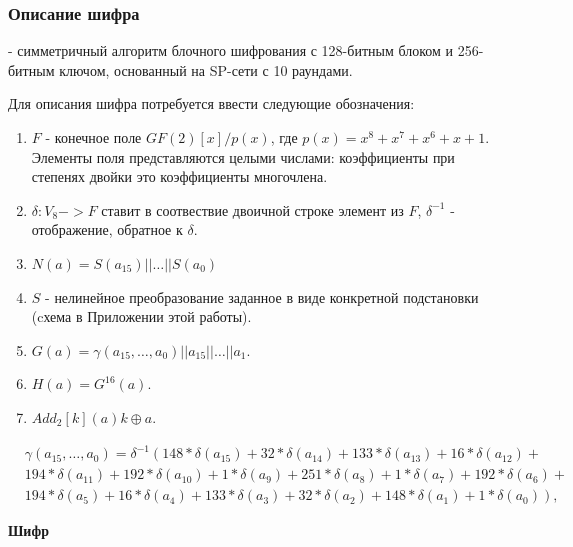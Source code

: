 \documentclass[colorthm]{./civarticle}
\begin{document}
\subsubsection{Описание шифра \textquotedbl}

\textquotedbl - симметричный алгоритм блочного шифрования с 128-битным блоком и 256-битным ключом, основанный на SP-сети с 10 раундами.

Для описания шифра потребуется ввести следующие обозначения:

\begin{enumerate}
    \item $F$ - конечное поле $GF(2)[x]/p(x)$, где $p(x) = x^8+x^7+x^6+x+1$. Элементы поля представляются целыми числами: коэффициенты при степенях двойки это коэффициенты многочлена.
    \item $\delta: V_8 -> F$ ставит в соотвествие двоичной строке элемент из $F$, $\delta^{-1}$ - отображение, обратное к $\delta$. 
    \item $N(a) = S(a_{15})||\dots||S(a_{0})$
    \item $S$ - нелинейное преобразование заданное в виде конкретной подстановки (cхема в Приложении этой работы).
    \item $G(a) = \gamma(a_{15}, \dots, a_0)||a_15||\dots||a_1$.
    \item $H(a) = G^{16}(a)$.
    \item $Add_2[k](a) k \oplus a$.
    
\end{enumerate}

\begin{equation}
    \begin{aligned}
& \gamma\left(a_{15}, \ldots, a_0\right)=\delta^{-1}\left(148 * \delta\left(a_{15}\right)+32 * \delta\left(a_{14}\right)+133 * \delta\left(a_{13}\right)+16 * \delta\left(a_{12}\right)+\right. \\
& 194 * \delta\left(a_{11}\right)+192 * \delta\left(a_{10}\right)+1 * \delta\left(a_9\right)+251 * \delta\left(a_8\right)+1 * \delta\left(a_7\right)+192 * \delta\left(a_6\right)+ \\
& \left.194 * \delta\left(a_5\right)+16 * \delta\left(a_4\right)+133 * \delta\left(a_3\right)+32 * \delta\left(a_2\right)+148 * \delta\left(a_1\right)+1 * \delta\left(a_0\right)\right),
\end{aligned}
\end{equation}

\textbf{Шифр \textquotedbl}
\end{document}
